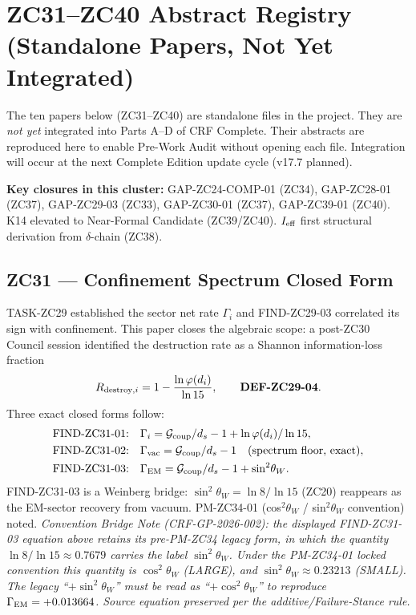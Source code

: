 \documentclass[11pt, a4paper]{article}
\newcommand{\Gcoup}{\mathcal{G}_{\rm coup}}
\begin{document}
\bigskip

\section{ZC31--ZC40 Abstract Registry (Standalone Papers, Not Yet Integrated)}
\label{sec:zc31-40-registry}

\begin{contentsbox}[title={Integration Status}]
The ten papers below (ZC31--ZC40) are standalone files in the project.
They are \emph{not yet} integrated into Parts A--D of CRF Complete.
Their abstracts are reproduced here to enable Pre-Work Audit without
opening each file. Integration will occur at the next Complete Edition
update cycle (v17.7 planned).

\textbf{Key closures in this cluster:}
GAP-ZC24-COMP-01 (ZC34), GAP-ZC28-01 (ZC37), GAP-ZC29-03 (ZC33),
GAP-ZC30-01 (ZC37), GAP-ZC39-01 (ZC40).
K14 elevated to Near-Formal Candidate (ZC39/ZC40).
$I_{\rm eff}$ first structural derivation from $\delta$-chain (ZC38).
\end{contentsbox}

\subsection{ZC31 --- Confinement Spectrum Closed Form}

\begin{zcbox}[title={ZC31: FIND-ZC31-01/02/03 --- Algebraic Spectrum + Weinberg Bridge}]
\sloppy
TASK-ZC29 established the sector net rate $\Gamma_i$ and FIND-ZC29-03
correlated its sign with confinement.
This paper closes the algebraic scope: a post-ZC30 Council session
identified the destruction rate as a Shannon information-loss fraction
\[
  R_{{\rm destroy},i} = 1 - \frac{\ln\varphi(d_i)}{\ln 15},
  \qquad \textbf{DEF-ZC29-04}.
\]
Three exact closed forms follow:
\begin{align*}
  \text{FIND-ZC31-01:}\quad
    & \Gamma_i = \Gcoup/d_s - 1 + \ln\varphi(d_i)/\ln 15,\\
  \text{FIND-ZC31-02:}\quad
    & \Gamma_{\rm vac} = \Gcoup/d_s - 1 \quad (\text{spectrum floor, exact}),\\
  \text{FIND-ZC31-03:}\quad
    & \Gamma_{\rm EM} = \Gcoup/d_s - 1 + \sin^2\!\theta_W.
\end{align*}
FIND-ZC31-03 is a Weinberg bridge: $\sin^2\theta_W = \ln 8/\ln 15$
(ZC20) reappears as the EM-sector recovery from vacuum.
PM-ZC34-01 (cos$^2\theta_W$ / sin$^2\theta_W$ convention) noted.
\textit{Convention Bridge Note (CRF-GP-2026-002): the displayed
FIND-ZC31-03 equation above retains its pre-PM-ZC34 legacy form,
in which the quantity $\ln8/\ln15\approx0.7679$ carries the label
$\sin^2\!\theta_W$. Under the PM-ZC34-01 locked convention this
quantity is $\cos^2\!\theta_W$ (LARGE), and $\sin^2\!\theta_W
\approx0.23213$ (SMALL). The legacy ``$+\sin^2\!\theta_W$'' must be
read as ``$+\cos^2\!\theta_W$'' to reproduce $\Gamma_{\rm EM}=+0.013664$.
Source equation preserved per the additive/Failure-Stance rule.}
\end{zcbox}
\end{document}
